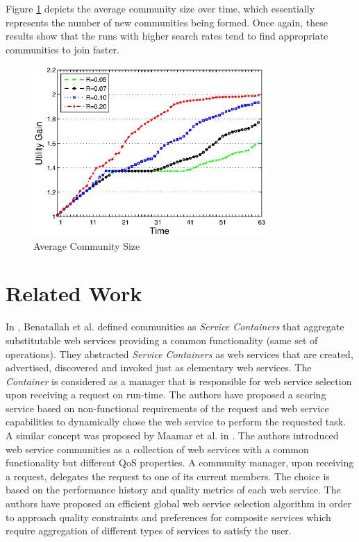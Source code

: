 Figure \ref{stats3} depicts the average community size over time, which essentially represents the number of new communities being formed. Once again, these results show that the runs with higher search rates tend to find appropriate communities to join faster.

\begin{figure}%
\centering
\includegraphics[width=3.5in]{figures/stats3.eps}
\caption{Average Community Size}
\label{stats3}
\end{figure}



\section{Related Work}\label{s:related_work}

In \cite{DBLP:journals/internet/BenatallahSD03}, Benatallah et al.
defined communities as \emph{Service Containers} that aggregate
substitutable web services providing a common functionality (same
set of operations). They abstracted \emph{Service Containers} as
web services that are created, advertised, discovered and invoked
just as elementary web services. The \emph{Container} is
considered as a manager that is responsible for web service
selection upon receiving a request on run-time. The authors have
proposed a scoring service based on non-functional requirements of
the request and web service capabilities to dynamically chose the
web service to perform the requested task. A similar concept was
proposed by Maamar et al. in
\cite{DBLP:journals/ijebr/MaamarSTBB09}. The authors introduced
web service communities as a collection of web services with a
common functionality but different QoS properties. A community
manager, upon receiving a request, delegates the request to one of
its current members. The choice is based on the performance
history and quality metrics of each web service. The authors have
proposed an efficient global web service selection algorithm in
order to approach quality constraints and preferences for
composite services which require aggregation of different types of
services to satisfy the user.

